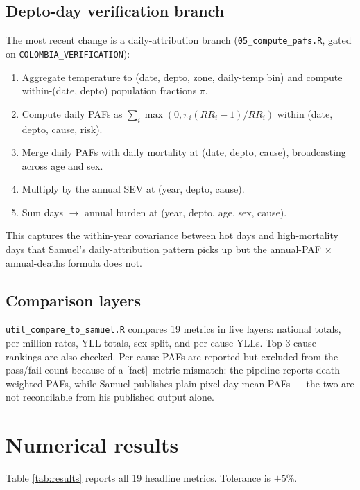 \documentclass[11pt]{article}
\newcommand{\fact}[0]{\textcolor{green!40!black}{[fact]}}
\begin{document}
\subsection{Depto-day verification branch}
\label{subsec:depto-day}

The most recent change is a daily-attribution branch
(\texttt{05\_compute\_pafs.R}, gated on \texttt{COLOMBIA\_VERIFICATION}):

\begin{enumerate}
  \item Aggregate temperature to (date, depto, zone, daily-temp bin) and
    compute within-(date, depto) population fractions $\pi$.
  \item Compute daily PAFs as $\sum_i \max(0, \pi_i (RR_i-1)/RR_i)$ within
    (date, depto, cause, risk).
  \item Merge daily PAFs with daily mortality at (date, depto, cause),
    broadcasting across age and sex.
  \item Multiply by the annual SEV at (year, depto, cause).
  \item Sum days $\to$ annual burden at
    (year, depto, age, sex, cause).
\end{enumerate}

This captures the within-year covariance between hot days and high-mortality
days that Samuel's daily-attribution pattern picks up but the
annual-PAF $\times$ annual-deaths formula does not.

\subsection{Comparison layers}

\texttt{util\_compare\_to\_samuel.R} compares 19 metrics in five layers:
national totals, per-million rates, YLL totals, sex split, and per-cause
YLLs. Top-3 cause rankings are also checked. Per-cause PAFs are reported
but excluded from the pass/fail count because of a \fact\ metric mismatch:
the pipeline reports death-weighted PAFs, while Samuel publishes plain
pixel-day-mean PAFs --- the two are not reconcilable from his published
output alone.

\section{Numerical results}
\label{sec:results}

Table \ref{tab:results} reports all 19 headline metrics. Tolerance is $\pm 5\%$.
\end{document}
